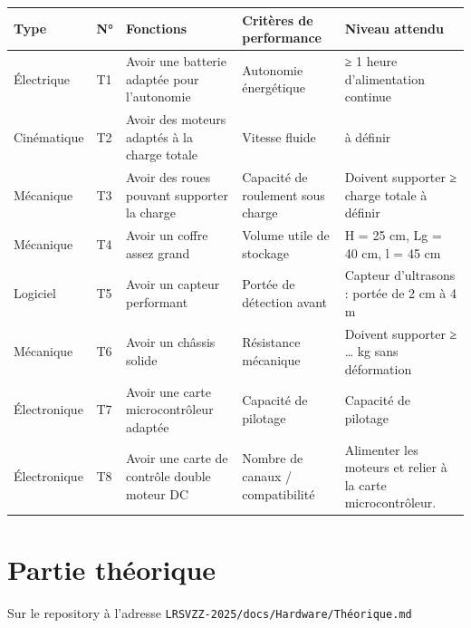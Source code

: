 \documentclass[a4paper,12pt]{report}  %
\begin{document}
{\fontsize{10pt}{12pt}\selectfont 
	\begin{longtable}{|l|l|p{4cm}|p{4cm}|p{4cm}|}
		\hline
		\textbf{Type} & \textbf{N°} & \textbf{Fonctions} 
		& \textbf{Critères de performance} & \textbf{Niveau attendu} \\
		\hline
		\endhead
		
		\hline
		\endfoot
		
		\hline
		Électrique & T1 & Avoir une batterie adaptée pour l'autonomie &
		Autonomie énergétique & ≥ 1 heure d'alimentation continue \\
		
		\hline
		Cinématique & T2 & Avoir des moteurs adaptés à la charge totale &
		Vitesse fluide & à définir \\
		
		\hline
		Mécanique & T3 & Avoir des roues pouvant supporter la charge & Capacité
		de roulement sous charge & Doivent supporter ≥ charge totale à définir \\
		
		\hline
		Mécanique & T4 & Avoir un coffre assez grand & Volume utile de stockage
		& H = 25 cm, Lg = 40 cm, l = 45 cm \\
		
		\hline
		Logiciel & T5 & Avoir un capteur performant & Portée de détection avant
		& Capteur d'ultrasons : portée de 2 cm à 4 m  \\
		
		\hline
		Mécanique & T6 & Avoir un châssis solide & Résistance mécanique &
		Doivent supporter ≥ \ldots{} kg sans déformation \\
		
		\hline
		Électronique & T7 & Avoir une carte microcontrôleur adaptée & Capacité
		de pilotage & Capacité de pilotage \\
		
		\hline
		Électronique & T8 & Avoir une carte de contrôle double moteur DC &
		Nombre de canaux / compatibilité & Alimenter les moteurs et relier à la
		carte microcontrôleur. \\
		
	\end{longtable}
}



\section{Partie théorique}
Sur le repository à l'adresse \texttt{LRSVZZ-2025/docs/Hardware/Théorique.md}
\end{document}
